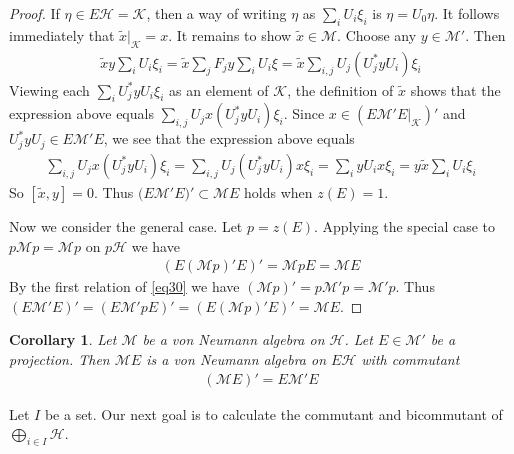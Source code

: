 \documentclass[12pt,b5paper,notitlepage]{article}
\theoremstyle{definition}
\theoremstyle{plain}
\newtheorem{co}[df]{Corollary}
\newcommand{\mc}{\mathcal}
\newcommand{\wtd}{\widetilde}
\numberwithin{equation}{section}
\begin{document}
\begin{proof}
If $\eta\in E\mc H=\mc K$, then a way of writing $\eta$ as $\sum_i U_i\xi_i$ is $\eta=U_0\eta$. It follows immediately that $\wtd x|_{\mc K}=x$. It remains to show $\wtd x\in\mc M$. Choose any $y\in\mc M'$. Then
\begin{align*}
\wtd xy\sum_i U_i\xi_i=\wtd x\sum_j F_jy\sum_i U_i\xi=\wtd x\sum_{i,j}U_j(U_j^*yU_i)\xi_i
\end{align*}
Viewing each $\sum_iU_j^*yU_i\xi_i$ as an element of $\mc K$, the definition of $\wtd x$ shows that the expression above equals $\sum_{i,j}U_jx(U_j^*yU_i)\xi_i$. Since $x\in(E\mc M'E|_{\mc K})'$ and $U_j^*yU_j\in E\mc M'E$, we see that the expression above equals
\begin{align*}
\sum_{i,j}U_jx(U_j^*yU_i)\xi_i=\sum_{i,j}U_j(U_j^*yU_i)x\xi_i=\sum_i yU_ix\xi_i=y\wtd x\sum_i U_i\xi_i
\end{align*}
So $[\wtd x,y]=0$. Thus $ \big(E\mc M'E\big)'\subset\mc ME$ holds when $z(E)=1$.

Now we consider the general case. Let $p=z(E)$. Applying the special case to $p\mc Mp=\mc Mp$ on $p\mc H$ we have
\begin{align*}
(E(\mc Mp)'E)'=\mc MpE=\mc ME
\end{align*}
By the first relation of \eqref{eq30} we have $(\mc Mp)'=p\mc M'p=\mc M'p$. Thus $(E\mc M'E)'=(E\mc M'pE)'=(E(\mc Mp)'E)'=\mc ME$.
\end{proof}


\begin{co}\label{lb82}
Let $\mc M$ be a von Neumann algebra on $\mc H$. Let $E\in\mc M'$ be a projection. Then $\mc ME$ is a von Neumann algebra on $E\mc H$ with commutant
\begin{align*}
(\mc ME)'=E\mc M' E
\end{align*}
\end{co}




Let $I$ be a set. Our next goal is to calculate the commutant and bicommutant of $\bigoplus_{i\in I}\mc H$.
\end{document}
